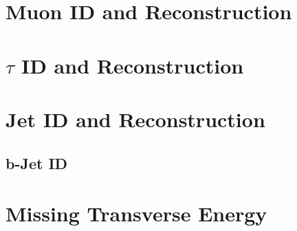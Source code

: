 

\section{Muon ID and Reconstruction}





\section{$\tau$ ID and Reconstruction}

\section{Jet ID and Reconstruction}

\subsection{b-Jet ID}
\section{Missing Transverse Energy}

